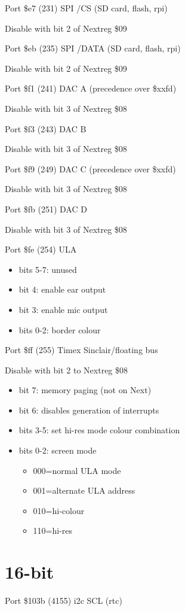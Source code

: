 Port \$e7 (231) SPI /CS (SD card, flash, rpi)

Disable with bit 2 of Nextreg \$09

Port \$eb (235) SPI /DATA (SD card, flash, rpi)

Disable with bit 2 of Nextreg \$09

Port \$f1 (241) DAC A (precedence over \$xxfd)

Disable with bit 3 of Nextreg \$08

Port \$f3 (243) DAC B

Disable with bit 3 of Nextreg \$08

Port \$f9 (249) DAC C (precedence over \$xxfd)

Disable with bit 3 of Nextreg \$08

Port \$fb (251) DAC D

Disable with bit 3 of Nextreg \$08

Port \$fe (254) ULA
\begin{itemize}
  \item[] bits 5-7: unused
  \item[] bit 4: enable ear output
  \item[] bit 3: enable mic output
  \item[] bits 0-2: border colour
\end{itemize}

Port \$ff (255) Timex Sinclair/floating bus

Disable with bit 2 to Nextreg \$08
\begin{itemize}
\item[] bit 7: memory paging (not on Next)
\item[] bit 6: disables generation of interrupts
\item[] bits 3-5: set hi-res mode colour combination
\item[] bits 0-2: screen mode
  \begin{itemize}
  \item[] 000=normal ULA mode
  \item[] 001=alternate ULA address
  \item[] 010=hi-colour
  \item[] 110=hi-res
  \end{itemize}
\end{itemize}

\section{16-bit}
Port \$103b (4155) i2c SCL (rtc)

